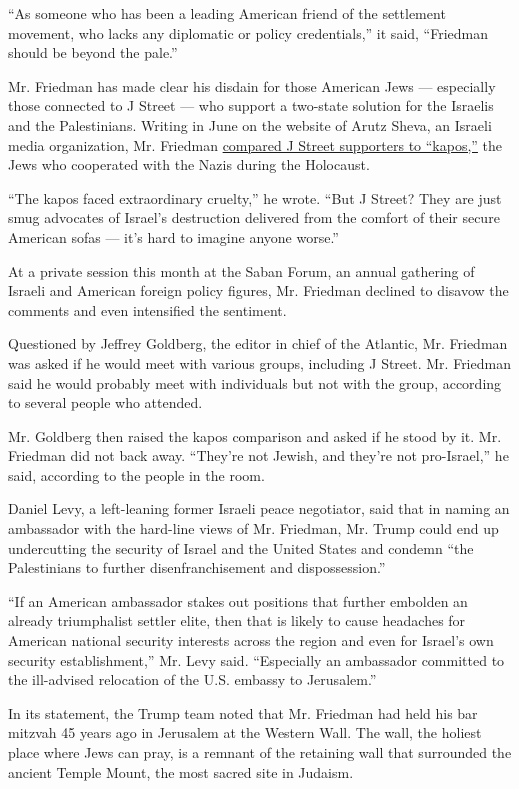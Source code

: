 ``As someone who has been a leading American friend of the settlement
movement, who lacks any diplomatic or policy credentials,'' it said,
``Friedman should be beyond the pale.''

Mr. Friedman has made clear his disdain for those American Jews ---
especially those connected to J Street --- who support a two-state
solution for the Israelis and the Palestinians. Writing in June on the
website of Arutz Sheva, an Israeli media organization, Mr. Friedman
\href{http://www.israelnationalnews.com/Articles/Article.aspx/18828}{compared
J Street supporters to ``kapos,''} the Jews who cooperated with the
Nazis during the Holocaust.

``The kapos faced extraordinary cruelty,'' he wrote. ``But J Street?
They are just smug advocates of Israel's destruction delivered from the
comfort of their secure American sofas --- it's hard to imagine anyone
worse.''

At a private session this month at the Saban Forum, an annual gathering
of Israeli and American foreign policy figures, Mr. Friedman declined to
disavow the comments and even intensified the sentiment.

Questioned by Jeffrey Goldberg, the editor in chief of the Atlantic, Mr.
Friedman was asked if he would meet with various groups, including J
Street. Mr. Friedman said he would probably meet with individuals but
not with the group, according to several people who attended.

Mr. Goldberg then raised the kapos comparison and asked if he stood by
it. Mr. Friedman did not back away. ``They're not Jewish, and they're
not pro-Israel,'' he said, according to the people in the room.

Daniel Levy, a left-leaning former Israeli peace negotiator, said that
in naming an ambassador with the hard-line views of Mr. Friedman, Mr.
Trump could end up undercutting the security of Israel and the United
States and condemn ``the Palestinians to further disenfranchisement and
dispossession.''

``If an American ambassador stakes out positions that further embolden
an already triumphalist settler elite, then that is likely to cause
headaches for American national security interests across the region and
even for Israel's own security establishment,'' Mr. Levy said.
``Especially an ambassador committed to the ill-advised relocation of
the U.S. embassy to Jerusalem.''

In its statement, the Trump team noted that Mr. Friedman had held his
bar mitzvah 45 years ago in Jerusalem at the Western Wall. The wall, the
holiest place where Jews can pray, is a remnant of the retaining wall
that surrounded the ancient Temple Mount, the most sacred site in
Judaism.

